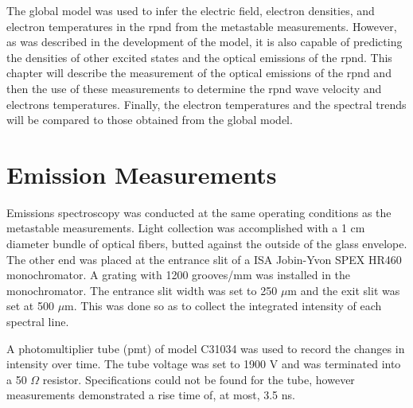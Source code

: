 The global model was used to infer the electric field, electron densities, and
electron temperatures in the \acs{rpnd} from the metastable measurements.
However, as was described in the development of the model, it is also capable of
predicting the densities of other excited states and the optical emissions of
the \acs{rpnd}. This chapter will describe the measurement of the optical
emissions of the \acs{rpnd} and then the use of these measurements to determine
the \acs{rpnd} wave velocity and electrons temperatures. Finally, the electron
temperatures and the spectral trends will be compared to those obtained from the
global model.

\section{Emission Measurements}

Emissions spectroscopy was conducted at the same operating conditions as the
metastable measurements. Light collection was accomplished with a 1 cm diameter
bundle of optical fibers, butted against the outside of the glass envelope. The
other end was placed at the entrance slit of a ISA Jobin-Yvon SPEX HR460
monochromator. A grating with 1200 grooves/mm was installed in the
monochromator. The entrance slit width was set to 250 $\mu$m and the exit slit
was set at 500 $\mu$m. This was done so as to collect the integrated intensity
of each spectral line.

A photomultiplier tube (\acs{pmt}) of model C31034 was used to record the
changes in intensity over time. The tube voltage was set to 1900 V and was
terminated into a 50 $\Omega$ resistor. Specifications could not be found for
the tube, however measurements demonstrated a rise time of, at most, 3.5 ns.

